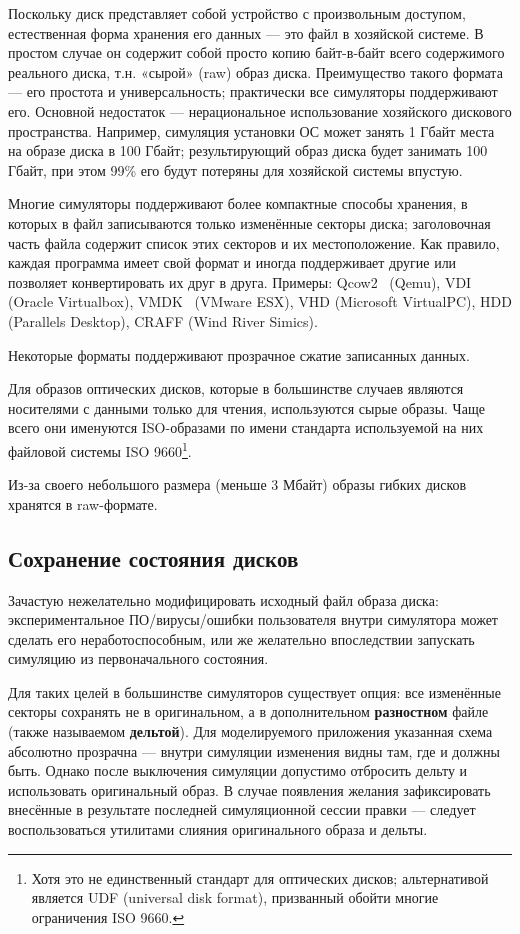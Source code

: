 Поскольку диск представляет собой устройство с произвольным доступом, естественная форма хранения его данных --- это файл в хозяйской системе. В простом случае он содержит собой просто копию байт-в-байт всего содержимого реального диска, т.н. «сырой» (\abbr raw) образ диска. Преимущество такого формата --- его простота и универсальность; практически все симуляторы поддерживают его. Основной недостаток --- нерациональное использование хозяйского дискового пространства. Например, симуляция установки ОС может занять 1 Гбайт места на образе диска в 100 Гбайт; результирующий образ диска будет занимать 100 Гбайт, при этом 99\% его будут потеряны для хозяйской системы впустую.

Многие симуляторы поддерживают более компактные способы хранения, в которых в файл записываются только изменённые секторы диска; заголовочная часть файла содержит список этих секторов и их местоположение. Как правило, каждая программа имеет свой формат и иногда поддерживает другие или позволяет конвертировать их друг в друга. Примеры: Qcow2~\cite{qcow2} (Qemu), VDI (Oracle Virtualbox), VMDK~\cite{vmdk} (VMware ESX), VHD (Microsoft VirtualPC), HDD (Parallels Desktop), CRAFF (Wind River Simics).

Некоторые форматы поддерживают прозрачное сжатие записанных данных.

Для образов оптических дисков, которые в большинстве  случаев являются носителями с данными только для чтения, используются сырые образы. Чаще всего они именуются ISO-образами по имени стандарта используемой на них файловой системы ISO 9660\footnote{Хотя это не единственный стандарт для оптических дисков; альтернативой является UDF (universal disk format), призванный обойти многие ограничения ISO 9660.}.

Из-за своего небольшого размера (меньше 3 Мбайт) образы гибких дисков хранятся в raw-формате.

\subsection{Сохранение состояния дисков}

Зачастую нежелательно модифицировать исходный файл образа диска: экспериментальное ПО/вирусы/ошибки пользователя внутри симулятора может сделать его неработоспособным, или же желательно впоследствии запускать симуляцию из первоначального состояния.

Для таких целей в большинстве симуляторов существует опция: все изменённые секторы сохранять не в оригинальном, а в дополнительном \textbf{разностном} файле (также называемом \textbf{дельтой}). Для моделируемого приложения указанная схема абсолютно прозрачна --- внутри симуляции изменения видны там, где и должны быть. Однако после выключения симуляции допустимо отбросить дельту и использовать оригинальный образ. В случае появления желания зафиксировать внесённые в результате последней симуляционной сессии правки --- следует воспользоваться утилитами слияния оригинального образа и дельты.

